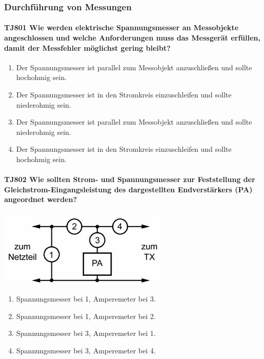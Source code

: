 \documentclass[8pt]{article}
\begin{document}
\pagebreak
\subsubsection{Durchführung von Messungen}
\paragraph*{TJ801 Wie werden elektrische Spannungsmesser an Messobjekte angeschlossen und welche Anforderungen muss das Messgerät erfüllen, damit der Messfehler möglichst gering bleibt?}
\begin{enumerate}[nolistsep,label=\Alph*]
\item Der Spannungsmesser ist parallel zum Messobjekt anzuschließen und sollte hochohmig sein.
\item Der Spannungsmesser ist in den Stromkreis einzuschleifen und sollte niederohmig sein. 
\item Der Spannungsmesser ist parallel zum Messobjekt anzuschließen und sollte niederohmig sein.
\item Der Spannungsmesser ist in den Stromkreis einzuschleifen und sollte hochohmig sein.
\end{enumerate}

\paragraph*{TJ802 Wie sollten Strom- und Spannungsmesser zur Feststellung der Gleichstrom-Eingangsleistung des dargestellten Endverstärkers (PA) angeordnet werden?}
\begin{center}
	\begin{minipage}{\linewidth}
		\centering
		\includegraphics[scale=1.0]{pics/tj802_a.jpg}
	\end{minipage}
\end{center}
\begin{enumerate}[nolistsep,label=\Alph*]
\item Spannungsmesser bei 1, Amperemeter bei 3.
\item Spannungsmesser bei 1, Amperemeter bei 2.
\item Spannungsmesser bei 3, Amperemeter bei 1.
\item Spannungsmesser bei 3, Amperemeter bei 4.
\end{enumerate}
\end{document}

